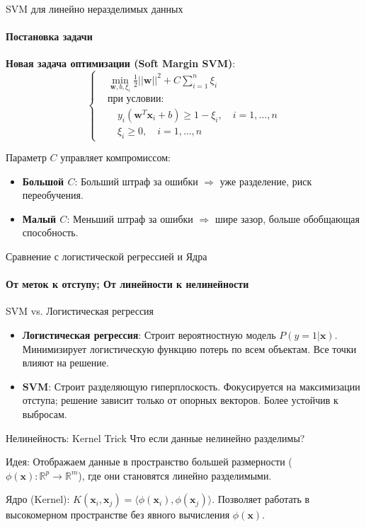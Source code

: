 \documentclass[notheorems, handout]{beamer}
\begin{document}
\begin{frame}{SVM для линейно неразделимых данных}
	\framesubtitle{Постановка задачи}
	\textbf{Новая задача оптимизации (Soft Margin SVM)}:
	\[
	\begin{cases}
		& \min_{\mathbf{w}, b, \xi_i} \frac{1}{2} ||\mathbf{w}||^2 + C \sum_{i=1}^n \xi_i \\
		& \text{при условии:} \\
		& \quad y_i (\mathbf{w}^T \mathbf{x}_i + b) \geq 1 - \xi_i, \quad i = 1, \dots, n \\
		& \quad \xi_i \geq 0, \quad i = 1, \dots, n
	\end{cases}
	\]

	\alert{Параметр $C$} управляет компромиссом:
	\begin{itemize}
		\item \textbf{Большой $C$}: Больший штраф за ошибки $\Rightarrow$ уже разделение, риск переобучения.
		\item \textbf{Малый $C$}: Меньший штраф за ошибки $\Rightarrow$ шире зазор, больше обобщающая способность.
	\end{itemize}
\end{frame}

\begin{frame}{Сравнение с логистической регрессией и Ядра}
	\framesubtitle{От меток к отступу; От линейности к нелинейности}

	\begin{block}{SVM vs. Логистическая регрессия}
		\begin{itemize}
			\item \textbf{Логистическая регрессия}: Строит \alert{вероятностную} модель $P(y=1|\mathbf{x})$. Минимизирует \alert{логистическую функцию потерь} по всем объектам. Все точки влияют на решение.
			\item \textbf{SVM}: Строит \alert{разделяющую гиперплоскость}. Фокусируется на \alert{максимизации отступа}; решение зависит только от \alert{опорных векторов}. Более устойчив к выбросам.
		\end{itemize}
	\end{block}

	\begin{block}{Нелинейность: Kernel Trick}
		Что если данные нелинейно разделимы?

		Идея: Отображаем данные в пространство \alert{большей размерности} ($\phi(\mathbf{x}): \mathbb{R}^p \rightarrow \mathbb{R}^m$), где они становятся линейно разделимыми.

		\alert{Ядро (Kernel)}: $K(\mathbf{x}_i, \mathbf{x}_j) = \langle \phi(\mathbf{x}_i), \phi(\mathbf{x}_j) \rangle$. Позволяет работать в высокомерном пространстве \alert{без явного вычисления} $\phi(\mathbf{x})$.
	\end{block}
\end{frame}
\end{document}
